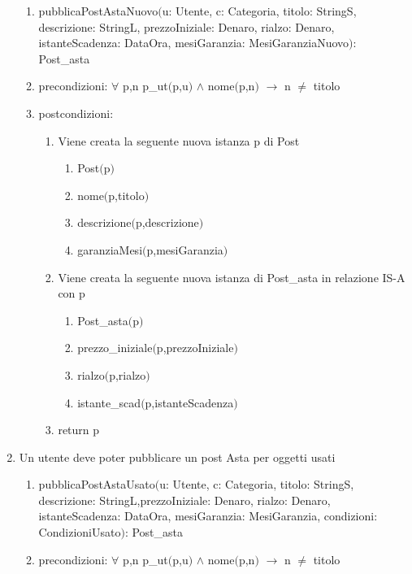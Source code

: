 \documentclass{article}
\begin{document}
\begin{enumerate}
\begin{enumerate}
        \item pubblicaPostAstaNuovo$($u: Utente, c: Categoria, titolo: StringS, descrizione: StringL, prezzoIniziale: Denaro, rialzo: Denaro, istanteScadenza: DataOra, mesiGaranzia: MesiGaranziaNuovo$)$: Post\_asta
        \item precondizioni: $\forall$ p,n p\_ut$($p,u$)$ $\land$ nome$($p,n$)$ $\rightarrow$ n $\neq$ titolo
        \item postcondizioni:
        \begin{enumerate}
            \item Viene creata la seguente nuova istanza p di Post
            \begin{enumerate}
                \item Post$($p$)$
                \item nome$($p,titolo$)$
                \item descrizione$($p,descrizione$)$
                \item garanziaMesi$($p,mesiGaranzia$)$
            \end{enumerate}
            \item Viene creata la seguente nuova istanza di Post\_asta in relazione IS-A con p
            \begin{enumerate}
                \item Post\_asta$($p$)$
                \item prezzo\_iniziale$($p,prezzoIniziale$)$
                \item rialzo$($p,rialzo$)$
                \item istante\_scad$($p,istanteScadenza$)$
            \end{enumerate}
            \item return p
        \end{enumerate}
    \end{enumerate}
    \item Un utente deve poter pubblicare un post Asta per oggetti usati
    \begin{enumerate}
        \item pubblicaPostAstaUsato$($u: Utente, c: Categoria, titolo: StringS, descrizione: StringL,\newline prezzoIniziale: Denaro, rialzo: Denaro, istanteScadenza: DataOra, mesiGaranzia: MesiGaranzia, condizioni: CondizioniUsato$)$: Post\_asta
        \item precondizioni: $\forall$ p,n p\_ut$($p,u$)$ $\land$ nome$($p,n$)$ $\rightarrow$ n $\neq$ titolo

\end{enumerate}
\end{enumerate}
\end{document}
